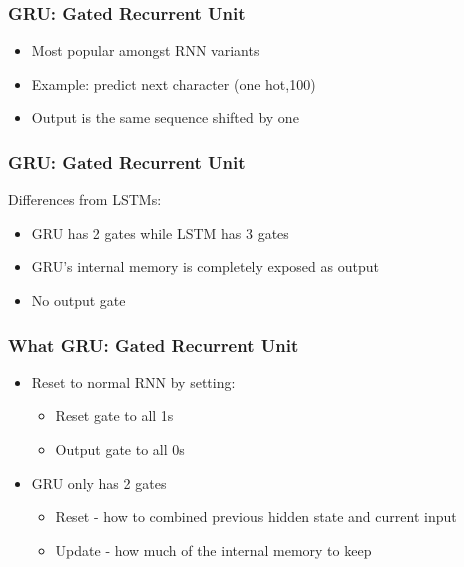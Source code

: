 %
%

\begin{frame}[fragile] \frametitle{GRU: Gated Recurrent Unit}
\begin{itemize}
\item Most popular amongst RNN variants
\item Example: predict next character (one hot,100)
\item Output is the same sequence shifted by one
\end{itemize}
\end{frame}

\begin{frame}[fragile] \frametitle{GRU: Gated Recurrent Unit}
Differences  from  LSTMs:
\begin{itemize}
\item  GRU has 2 gates while LSTM has 3 gates
\item GRU's internal memory is completely exposed as output
\item No output gate
\end{itemize}
\end{frame}


\begin{frame}[fragile] \frametitle{What GRU: Gated Recurrent Unit}
\begin{itemize}
\item  Reset  to normal  RNN  by setting:
\begin{itemize}
\item   Reset gate to all 1s
\item    Output gate to all 0s
\end{itemize}
\item  GRU  only has 2 gates
\begin{itemize}
\item   Reset - how to combined previous hidden state and current input
\item  Update - how much of the internal memory to keep
\end{itemize}
\end{itemize}
\end{frame}


